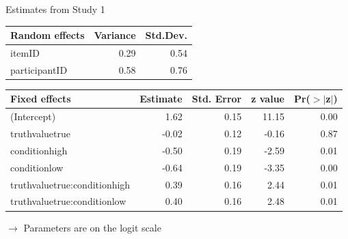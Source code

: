 \documentclass[aspectratio=169]{beamer}
\begin{document}
\begin{frame}{Estimates from Study 1}
\begin{tabular}{lrr}
  \hline
  {\bf Random effects} & Variance & Std.Dev. \\ 
  \hline
itemID          & 0.29 & 0.54 \\ 
participantID   & 0.58 & 0.76 \\ 
   \hline
\end{tabular}

\vspace{.5cm}

\begin{tabular}{lrrrr}
  \hline
  {\bf Fixed effects} & Estimate & Std. Error & z value & Pr($>$$|$z$|$) \\ 
  \hline
  (Intercept)                   &  1.62 & 0.15 & 11.15 & 0.00 \\ 
  truthvaluetrue                & -0.02 & 0.12 & -0.16 & 0.87 \\ 
  conditionhigh                 & -0.50 & 0.19 & -2.59 & 0.01 \\ 
  conditionlow                  & -0.64 & 0.19 & -3.35 & 0.00 \\ 
  truthvaluetrue:conditionhigh  &  0.39 & 0.16 &  2.44 & 0.01 \\ 
  truthvaluetrue:conditionlow   &  0.40 & 0.16 &  2.48 & 0.01 \\ 
   \hline
\end{tabular}

\vspace{.5cm}
\pause
$\to$ Parameters are on the logit scale
\end{frame}
\end{document}
